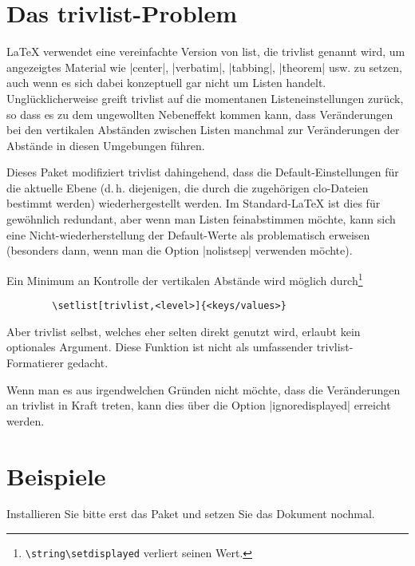 \documentclass[a4paper,ngerman]{ltxguide}
\newcommand\0{\unskip\enspace\fbox{\fontsize{4}{4}\selectfont NEU 3.0}}
\newcommand\3{\unskip\enspace\fbox{\fontsize{4}{4}\selectfont NEW 3.0}}
\begin{document}
	
	\section{Das trivlist-Problem}
	
\LaTeX{} verwendet eine vereinfachte Version von \textsf{list}, die \textsf{trivlist} genannt wird, um angezeigtes 
Material wie |center|, |verbatim|, |tabbing|, |theorem| usw. zu setzen, auch wenn es sich dabei konzeptuell gar nicht um 
Listen handelt. Ungl\"ucklicherweise greift \textsf{trivlist} auf die momentanen Listeneinstellungen zur\"uck, so dass 
es zu dem ungewollten Nebeneffekt kommen kann, dass Ver\"anderungen bei den
vertikalen Abst\"anden zwischen Listen manchmal zur Ver\"anderungen der
Abst\"ande in diesen Umgebungen f\"uhren. 
	
Dieses Paket modifiziert \textsf{trivlist} dahingehend, dass die Default-Einstellungen f\"ur die aktuelle Ebene 
(d.\,h. diejenigen, die durch die zugeh\"origen \textsf{clo}-Dateien bestimmt werden) wiederhergestellt werden. Im 
Standard-\LaTeX{} ist dies f\"ur gew\"ohnlich redundant, aber wenn man
Listen feinabstimmen m\"ochte, kann sich eine Nicht-wiederherstellung der Default-Werte als problematisch erweisen 
(besonders dann, wenn man die Option |nolistsep| verwenden m\"ochte).
	
Ein Minimum an Kontrolle der vertikalen Abst\"ande wird m\"oglich
durch\footnote{\verb|\string\setdisplayed| verliert seinen Wert.}

	\begin{verbatim}	
		\setlist[trivlist,<level>]{<keys/values>}
	\end{verbatim}
	
Aber \textsf{trivlist} selbst, welches eher selten direkt genutzt wird, erlaubt kein optionales Argument. Diese 
Funktion ist nicht als umfassender \textsf{trivlist}-Formatierer gedacht.
	
Wenn man es aus irgendwelchen Gr\"unden nicht m\"ochte, dass die Ver\"anderungen an \textsf{trivlist} in Kraft treten, 
kann dies \"uber die Option |ignoredisplayed| erreicht werden.

	
	\section{Beispiele}


Installieren Sie bitte erst das Paket und setzen Sie das Dokument nochmal.
\end{document}

